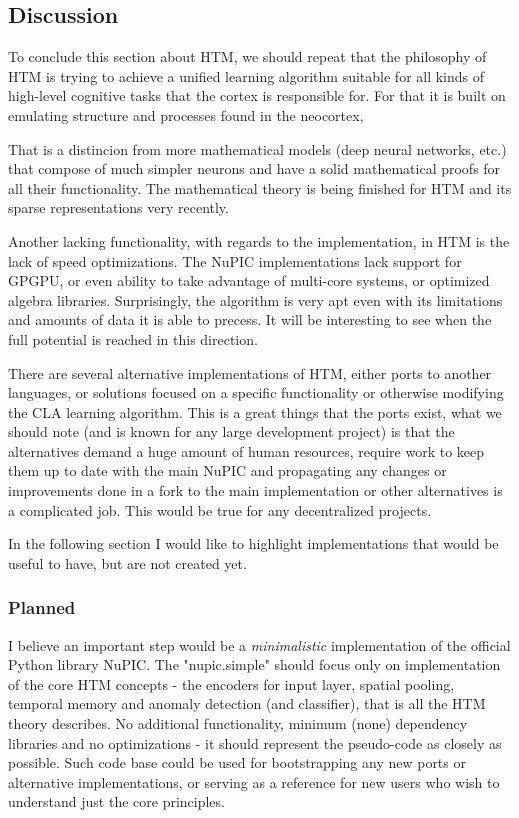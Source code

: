 \documentclass[a4,IEEEconf]{article}
\begin{document}
\subsection{Discussion}
To conclude this section about HTM, we should repeat that the philosophy of HTM is trying to achieve a unified learning algorithm suitable for all kinds of high-level cognitive tasks that the cortex is responsible for. For that it is built on emulating structure and processes found in the neocortex, 

That is a distincion from more mathematical models (deep neural networks, etc.) that compose of much simpler neurons and have a solid mathematical proofs for all their functionality. The mathematical theory is being finished for HTM and its sparse representations very recently. 

Another lacking functionality, with regards to the implementation, in HTM is the lack of speed optimizations. The NuPIC implementations lack support for GPGPU, or even ability to take advantage of multi-core systems, or optimized algebra libraries. Surprisingly, the algorithm is very apt even with its limitations and amounts of data it is able to precess. It will be interesting to see when the full potential is reached in this direction. 

There are several alternative implementations of HTM, either ports to another languages, or solutions focused on a specific functionality or otherwise modifying the CLA learning algorithm. This is a great things that the ports exist, what we should note (and is known for any large development project) is that the alternatives demand a huge amount of human resources, require work to keep them up to date with the main NuPIC and propagating any changes or improvements done in a fork to the main implementation or other alternatives is a complicated job. This would be true for any decentralized projects. 

In the following section I would like to highlight implementations that would be useful to have, but are not created yet. 
\subsubsection{Planned}
I believe an important step would be a \textit{minimalistic} implementation of the official Python library NuPIC. The "nupic.simple" should focus only on implementation of the core HTM concepts - the encoders for input layer, spatial pooling, temporal memory and anomaly detection (and classifier), that is all the HTM theory describes. No additional functionality, minimum (none) dependency libraries and no optimizations - it should represent the pseudo-code as closely as possible. Such code base could be used for bootstrapping any new ports or alternative implementations, or serving as a reference for new users who wish to understand just the core principles. 
\end{document}
